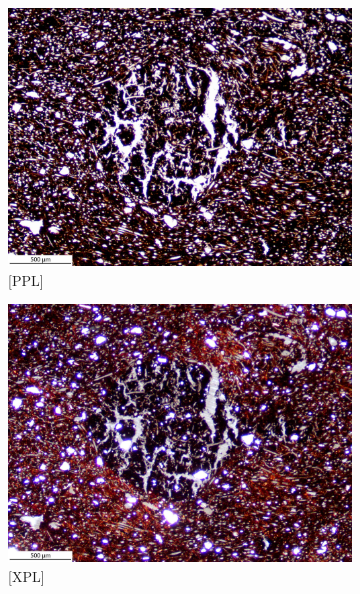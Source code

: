 \documentclass[a4paper]{article}
\begin{document}
\begin{figure}[H]
	\centering
	\begin{subfigure}[t]{.49\textwidth}
		\includegraphics[width=\textwidth]{ThinSections/104-1_4x_PPL.jpg}
		\caption{[PPL]}
	\end{subfigure}\hspace{.5em}\hfill
	\begin{subfigure}[t]{.49\textwidth}
		\includegraphics[width=\textwidth]{ThinSections/104-1_4x_XPL.jpg}
		\caption{[XPL]}
	\end{subfigure}
	\begin{subfigure}[t]{.32\textwidth}

\end{subfigure}
\end{figure}
\end{document}

